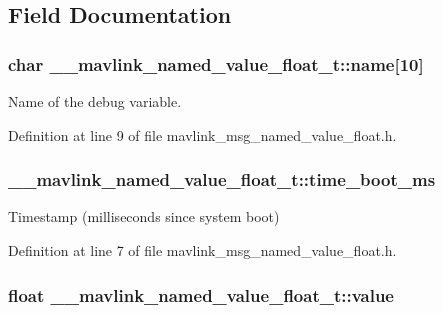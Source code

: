 \subsection{Field Documentation}
\hypertarget{struct____mavlink__named__value__float__t_a1e916005f34f9fffc7144d8b71b890d8}{
\subsubsection[{name}]{\setlength{\rightskip}{0pt plus 5cm}char \-\_\-\-\_\-mavlink\-\_\-named\-\_\-value\-\_\-float\-\_\-t\-::name\mbox{[}10\mbox{]}}}\label{struct____mavlink__named__value__float__t_a1e916005f34f9fffc7144d8b71b890d8}


Name of the debug variable. 



Definition at line 9 of file mavlink\-\_\-msg\-\_\-named\-\_\-value\-\_\-float.\-h.

\hypertarget{struct____mavlink__named__value__float__t_a46e6c60e5c779ce8f3e808c485aa620f}{
\subsubsection[{time\-\_\-boot\-\_\-ms}]{ \-\_\-\-\_\-mavlink\-\_\-named\-\_\-value\-\_\-float\-\_\-t\-::time\-\_\-boot\-\_\-ms}}\label{struct____mavlink__named__value__float__t_a46e6c60e5c779ce8f3e808c485aa620f}


Timestamp (milliseconds since system boot) 



Definition at line 7 of file mavlink\-\_\-msg\-\_\-named\-\_\-value\-\_\-float.\-h.

\hypertarget{struct____mavlink__named__value__float__t_a44c8c857d4e8732bccb9ef9ed1e2a386}{
\subsubsection[{value}]{\setlength{\rightskip}{0pt plus 5cm}float \-\_\-\-\_\-mavlink\-\_\-named\-\_\-value\-\_\-float\-\_\-t\-::value}}\label{struct____mavlink__named__value__float__t_a44c8c857d4e8732bccb9ef9ed1e2a386}


